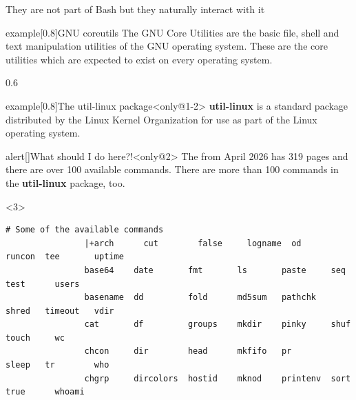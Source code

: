 
\begin{frame}[fragile]{They are not part of Bash but they naturally interact with it}
    \begin{varblock}{example}[0.8\textwidth]{GNU coreutils}
        The GNU Core Utilities are the basic file, shell and text manipulation utilities of the GNU operating system.
        These are the core utilities which are expected to exist on every operating system.
    \end{varblock}
    \begin{overlayarea}{\textwidth}{0.6\textheight}
        \begin{varblock}{example}[0.8\textwidth]{The util-linux package}<only@1-2>
            \textbf{util-linux} is a standard package distributed by the Linux Kernel Organization for use as part of the Linux operating system.
        \end{varblock}
        \PrepareURLsymbol[PB]
        \begin{varblock}{alert}[\textwidth]{What should I do here?!}<only@2>
            The  from April 2026 has \alert{319 pages} and there are \alert{over 100 available commands}.
            There are \alert{more than 100 commands} in the \textbf{util-linux} package, too.
        \end{varblock}
        \begin{onlyenv}<3>
            \begin{lstlisting}[style=myBash, style=smaller, numbers=none, aboveskip=3mm]
                # Some of the available commands
                |+arch      cut        false     logname  od        runcon  tee       uptime
                base64    date       fmt       ls       paste     seq     test      users
                basename  dd         fold      md5sum   pathchk   shred   timeout   vdir
                cat       df         groups    mkdir    pinky     shuf    touch     wc
                chcon     dir        head      mkfifo   pr        sleep   tr        who
                chgrp     dircolors  hostid    mknod    printenv  sort    true      whoami

\end{lstlisting}
\end{onlyenv}
\end{overlayarea}
\end{frame}
